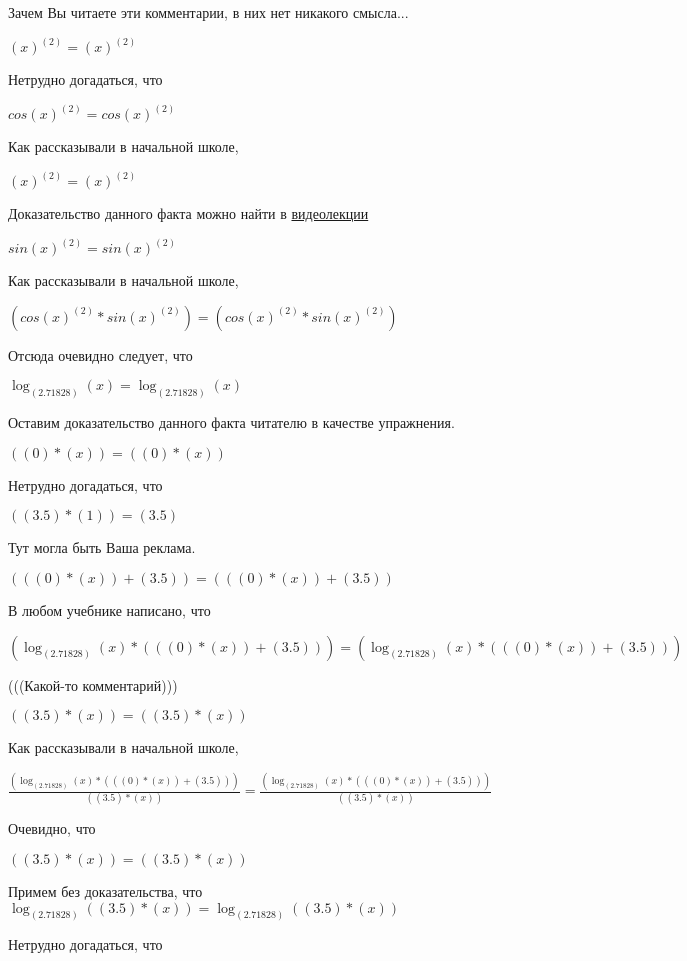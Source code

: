 \documentclass[12pt,a4paper,fleqn]{article}
\theoremstyle{definition}
\begin{document}
Зачем Вы читаете эти комментарии, в них нет никакого смысла...

${( x )}^{( 2 )} = {( x )}^{( 2 )}$

Нетрудно догадаться, что

$cos{( x )}^{( 2 )} = cos{( x )}^{( 2 )}$

Как рассказывали в начальной школе,

${( x )}^{( 2 )} = {( x )}^{( 2 )}$

Доказательство данного факта можно найти в \href{https://www.youtube.com/watch?v=dQw4w9WgXcQ}{видеолекции}

$sin{( x )}^{( 2 )} = sin{( x )}^{( 2 )}$

Как рассказывали в начальной школе,

$(cos{( x )}^{( 2 )} * sin{( x )}^{( 2 )}) = (cos{( x )}^{( 2 )} * sin{( x )}^{( 2 )})$

Отсюда очевидно следует, что

$\log_{( 2.71828 )}{( x )} = \log_{( 2.71828 )}{( x )}$

Оставим доказательство данного факта читателю в качестве упражнения.

$(( 0 ) * ( x )) = (( 0 ) * ( x ))$

Нетрудно догадаться, что

$(( 3.5 ) * ( 1 )) = ( 3.5 )$

Тут могла быть Ваша реклама.

$((( 0 ) * ( x )) + ( 3.5 )) = ((( 0 ) * ( x )) + ( 3.5 ))$

В любом учебнике написано, что

$(\log_{( 2.71828 )}{( x )} * ((( 0 ) * ( x )) + ( 3.5 ))) = (\log_{( 2.71828 )}{( x )} * ((( 0 ) * ( x )) + ( 3.5 )))$

(((Какой-то комментарий)))

$(( 3.5 ) * ( x )) = (( 3.5 ) * ( x ))$

Как рассказывали в начальной школе,

$\frac{(\log_{( 2.71828 )}{( x )} * ((( 0 ) * ( x )) + ( 3.5 )))}{(( 3.5 ) * ( x ))}
 = \frac{(\log_{( 2.71828 )}{( x )} * ((( 0 ) * ( x )) + ( 3.5 )))}{(( 3.5 ) * ( x ))}
$

Очевидно, что

$(( 3.5 ) * ( x )) = (( 3.5 ) * ( x ))$

Примем без доказательства, что
$\log_{( 2.71828 )}{(( 3.5 ) * ( x ))} = \log_{( 2.71828 )}{(( 3.5 ) * ( x ))}$

Нетрудно догадаться, что
\end{document}
